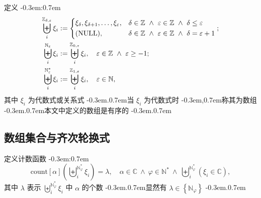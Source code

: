 \documentclass{article}
\newcommand\BrSetN[1]{\Set{\MathPartialSetN{#1}}}
\newcommand\InPartialSetN[2]{\InSet{#1}{\BrSetN{#2}}}
\newcommand\InSetC[1]{\InSet{#1}{\MathSetC}}
\newcommand\InSetN[1]{\InSet{#1}{\MathSetN}}
\newcommand\InSetU[1]{\InSet{#1}{\MathSetU}}
\newcommand\InSetZ[1]{\InSet{#1}{\MathSetZ}}
\newcommand\MathPartialSetN[1]{\mathbb{N}_{#1}}
\newcommand\MathPartialSetU[1]{\mathbb{N}^{\ast}_{#1}}
\newcommand\MathPartialSetZ[2]{\mathbb{Z}_{\MultiSub{#1}{#2}}}
\newcommand\MathSetC{\mathbb{C}}
\newcommand\MathSetN{\mathbb{N}}
\newcommand\MathSetU{\mathbb{N}^{\ast}}
\newcommand\MathSetZ{\mathbb{Z}}
\newcommand\NormalSeqOfN[3]{\SeqOfN{#1}{#2} #3_{#1}}
\newcommand\NormalSeqOfU[3]{\SeqOfU{#1}{#2} #3_{#1}}
\newcommand\NormalSeqOfZ[4]{\SeqOfZ{#1}{#2}{#3} #4_{#1}}
\newcommand\SeqOfUInSetC[3]{\SeqOfU{#1}{#2} \Bracket{\InSetC{#3_{#1}}}}
\newcommand\SeqOfN[2]{\Seq{#1}{\MathPartialSetN{#2}}}
\newcommand\SeqOfU[2]{\Seq{#1}{\MathPartialSetU{#2}}}
\newcommand\SeqOfZ[3]{\Seq{#1}{\MathPartialSetZ{#2}{#3}}}
\newcommand\Bracket[1]{\left( #1 \right)}
\newcommand\BracketBig[1]{\left\{ #1 \right\}}
\newcommand\BracketMid[1]{\left[ #1 \right]}
\newcommand\CaseDomain[1]{\DomainComma & #1}
\newcommand\Colon{:}
\newcommand\Comma{,}
\newcommand\CommaSub{\Comma}
\newcommand\Count{\text{count}}
\newcommand\DefineAs{:=}
\newcommand\Domain[1]{\DomainComma \quad #1}
\newcommand\DomainAnd{\LogicAnd}
\newcommand\DomainComma{\Comma}
\newcommand\FlatSeqOfXi{\xi_{\delta} \SeqComma \xi_{\delta+1} \SeqComma \ldots \SeqComma \xi_{\varepsilon}}
\newcommand\Func[2]{#1 \Bracket{#2}}
\newcommand\InSet[2]{#1 \in #2}
\newcommand\Logic[1]{\ #1\ }
\newcommand\LogicAnd{\Logic{\wedge}}
\newcommand\MultiSub[2]{#1 \CommaSub #2}
\newcommand\Seq[2]{\biguplus_{#1}^{#2}}
\newcommand\SeqComma{\Comma}
\newcommand\SeqXi{\NormalSeqOfU{i}{\varphi}{\xi}}
\newcommand\Set[1]{\BracketBig{#1}}
\newcommand\EqEndComma{\Comma}
\newcommand\EqEndSemicolon{;}
\newcommand\TextBracket[1]{(#1)}
\newcommand\TextColon{\TextPunctuation{\Colon}}
\newcommand\TextComma{\TextPunctuation{\Comma}}
\newcommand\TextPeriod{\TextPunctuation{.}}
\newcommand\TextPunctuation[1]{\kern -0.3em#1\kern 0.7em}
\begin{document}
	定义 \TextColon
	\begin{align*}
	\NormalSeqOfZ{i}{\delta}{\varepsilon}{\xi} & \DefineAs
	\begin{dcases}
	\FlatSeqOfXi \CaseDomain{\InSetZ{\delta} \DomainAnd \InSetZ{\varepsilon} \DomainAnd \delta \leq \varepsilon} \\
	\text{\TextBracket{NULL}} \CaseDomain{\InSetZ{\delta} \DomainAnd \InSetZ{\varepsilon} \DomainAnd \delta = \varepsilon+1}
	\end{dcases} \EqEndSemicolon \\
	\NormalSeqOfN{i}{\varepsilon}{\xi} & \DefineAs \NormalSeqOfZ{i}{0}{\varepsilon}{\xi} \Domain{\InSetZ{\varepsilon} \DomainAnd \varepsilon \geq -1} \EqEndSemicolon \\
	\NormalSeqOfU{i}{\varepsilon}{\xi} & \DefineAs \NormalSeqOfZ{i}{1}{\varepsilon}{\xi} \Domain{\InSetN{\varepsilon}} \EqEndComma
	\end{align*}
	其中 $\xi_{i}$ 为代数式或关系式 \TextPeriod 当 $\xi_{i}$ 为代数式时 \TextComma 称其为数组 \TextPeriod 本文中定义的数组是有序的 \TextPeriod
	
	
	\subsection{数组集合与齐次轮换式}
	定义计数函数 \TextColon
	\begin{equation*}
	\Func{\Count \BracketMid{\alpha}}{\SeqXi} = \lambda \Domain{\InSetC{\alpha} \DomainAnd \InSetU{\varphi} \DomainAnd \SeqOfUInSetC{i}{\varphi}{\xi}} \EqEndComma
	\end{equation*}
	其中 $\lambda$ 表示 $\SeqXi$ 中 $\alpha$ 的个数 \TextPeriod 显然有 $\InPartialSetN{\lambda}{\varphi}$ \TextPeriod
	
\end{document}
